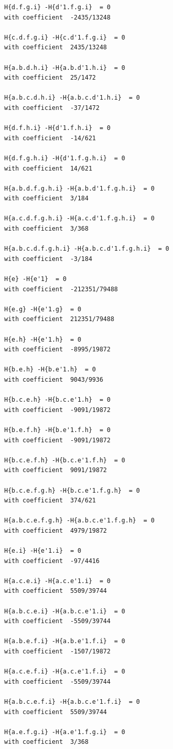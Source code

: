 \documentclass[11pt, a4paper]{kybernetika}
\begin{document}
\begin{verbatim}
		H{d.f.g.i} -H{d'1.f.g.i}  = 0
		with coefficient  -2435/13248
		
		H{c.d.f.g.i} -H{c.d'1.f.g.i}  = 0
		with coefficient  2435/13248
		
		H{a.b.d.h.i} -H{a.b.d'1.h.i}  = 0
		with coefficient  25/1472
		
		H{a.b.c.d.h.i} -H{a.b.c.d'1.h.i}  = 0
		with coefficient  -37/1472
		
		H{d.f.h.i} -H{d'1.f.h.i}  = 0
		with coefficient  -14/621
		
		H{d.f.g.h.i} -H{d'1.f.g.h.i}  = 0
		with coefficient  14/621
		
		H{a.b.d.f.g.h.i} -H{a.b.d'1.f.g.h.i}  = 0
		with coefficient  3/184
		
		H{a.c.d.f.g.h.i} -H{a.c.d'1.f.g.h.i}  = 0
		with coefficient  3/368
		
		H{a.b.c.d.f.g.h.i} -H{a.b.c.d'1.f.g.h.i}  = 0
		with coefficient  -3/184
		
		H{e} -H{e'1}  = 0
		with coefficient  -212351/79488
		
		H{e.g} -H{e'1.g}  = 0
		with coefficient  212351/79488
		
		H{e.h} -H{e'1.h}  = 0
		with coefficient  -8995/19872
		
		H{b.e.h} -H{b.e'1.h}  = 0
		with coefficient  9043/9936
		
		H{b.c.e.h} -H{b.c.e'1.h}  = 0
		with coefficient  -9091/19872
		
		H{b.e.f.h} -H{b.e'1.f.h}  = 0
		with coefficient  -9091/19872
		
		H{b.c.e.f.h} -H{b.c.e'1.f.h}  = 0
		with coefficient  9091/19872
		
		H{b.c.e.f.g.h} -H{b.c.e'1.f.g.h}  = 0
		with coefficient  374/621
		
		H{a.b.c.e.f.g.h} -H{a.b.c.e'1.f.g.h}  = 0
		with coefficient  4979/19872
		
		H{e.i} -H{e'1.i}  = 0
		with coefficient  -97/4416
		
		H{a.c.e.i} -H{a.c.e'1.i}  = 0
		with coefficient  5509/39744
		
		H{a.b.c.e.i} -H{a.b.c.e'1.i}  = 0
		with coefficient  -5509/39744
		
		H{a.b.e.f.i} -H{a.b.e'1.f.i}  = 0
		with coefficient  -1507/19872
		
		H{a.c.e.f.i} -H{a.c.e'1.f.i}  = 0
		with coefficient  -5509/39744
		
		H{a.b.c.e.f.i} -H{a.b.c.e'1.f.i}  = 0
		with coefficient  5509/39744
		
		H{a.e.f.g.i} -H{a.e'1.f.g.i}  = 0
		with coefficient  3/368
		

\end{verbatim}
\end{document}
